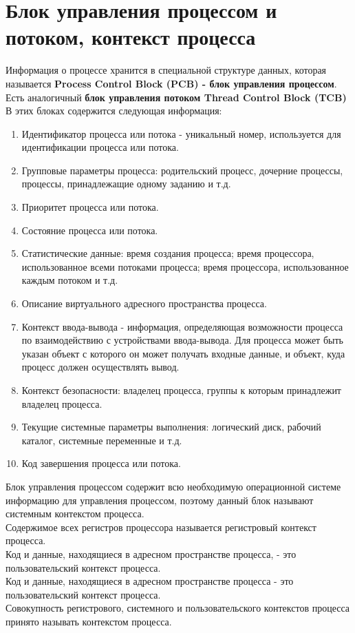 \documentclass[a4paper]{article}
\begin{document}
\section{Блок управления процессом и потоком, контекст процесса}
\setcounter{subsection}{0}
Информация о процессе хранится в специальной структуре данных, которая называется \textbf{Process Control Block (PCB) - блок управления процессом}. Есть аналогичный \textbf{блок управления потоком Thread Control Block (TCB)}\\
В этих блоках содержится следующая информация:
\begin{enumerate}
        \item Идентификатор процесса или потока - уникальный номер, используется для идентификации процесса или потока.
	\item Групповые параметры процесса: родительский процесс, дочерние процессы, процессы, принадлежащие одному заданию и т.д.
	\item Приоритет процесса или потока.
	\item Состояние процесса или потока.
	\item Статистические данные: время создания процесса; время процессора, использованное всеми потоками процесса; время процессора, использованное каждым потоком и т.д.
	\item Описание виртуального адресного пространства процесса.
	\item Контекст ввода-вывода - информация, определяющая возможности процесса по взаимодействию с устройствами ввода-вывода. Для процесса может быть указан объект с которого он может получать входные данные, и объект, куда процесс должен осуществлять вывод.
	\item Контекст безопасности: владелец процесса, группы к которым принадлежит владелец процесса.
	\item Текущие системные параметры выполнения: логический диск, рабочий каталог, системные переменные и т.д.
	\item Код завершения процесса или потока.
\end{enumerate}
Блок управления процессом содержит всю необходимую операционной системе информацию для управления процессом, поэтому данный блок называют системным контекстом процесса.\\
Содержимое всех регистров процессора называется регистровый контекст процесса.\\
Код и данные, находящиеся в адресном пространстве процесса, - это пользовательский контекст процесса.\\
Код и данные, находящиеся в адресном пространстве процесса - это пользовательский контекст процесса.\\
Совокупность регистрового, системного и пользовательского контекстов процесса принято называть контекстом процесса.\\
\end{document}
